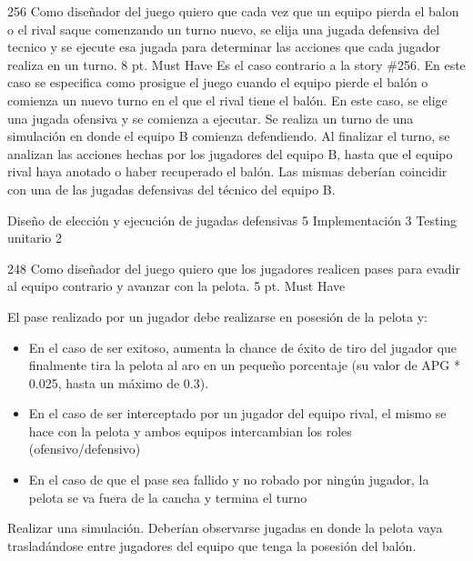 \vspace{1cm}


\sprintstory
{256}
{Como diseñador del juego quiero que cada vez que un equipo pierda el balon o el rival saque comenzando un turno nuevo, se elija una jugada defensiva del tecnico y se ejecute esa jugada para determinar las acciones que cada jugador realiza en un turno.}
{8 pt.}
{Must Have}
{Es el caso contrario a la story \#256. En este caso se especifica como prosigue el juego cuando el equipo pierde el balón o comienza un nuevo turno en
el que el rival tiene el balón. En este caso, se elige una jugada ofensiva y se comienza a ejecutar.}
{Se realiza un turno de una simulación en donde el equipo B comienza defendiendo. Al finalizar el turno, se analizan las acciones
hechas por los jugadores del equipo B, hasta que el equipo rival haya anotado o haber recuperado el balón. Las mismas deberían coincidir con una de las jugadas defensivas del técnico del equipo B.  }

\begin{taskstable}
 \task
 {Diseño de elección y ejecución de jugadas defensivas}
 {5}
 \task
 {Implementación}
 {3}
 \task
 {Testing unitario}
 {2}
\end{taskstable}

\vspace{1cm}


\sprintstory
{248}
{ Como diseñador del juego quiero que los jugadores realicen pases para evadir al equipo contrario y avanzar con la pelota.}
{5 pt.}
{Must Have}
{El pase realizado por un jugador debe realizarse en posesión de la pelota y:
\begin{itemize}
	\item En el caso de ser exitoso, aumenta la chance de éxito de tiro del jugador que finalmente tira la pelota al aro en un pequeño porcentaje (su valor de APG * 0.025, hasta un máximo de 0.3).
	\item En el caso de ser interceptado por un jugador del equipo rival, el mismo se hace con la pelota y ambos equipos intercambian los roles (ofensivo/defensivo)
	\item En el caso de que el pase sea fallido y no robado por ningún jugador, la pelota se va fuera de la cancha y termina el turno
\end{itemize}}
{Realizar una simulación. Deberían observarse jugadas en donde la pelota vaya trasladándose entre jugadores del equipo que tenga la posesión del balón.}

